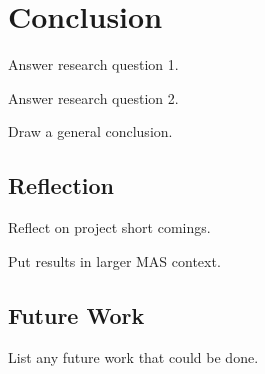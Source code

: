 \section{Conclusion}

Answer research question 1.

Answer research question 2.

Draw a general conclusion.

\subsection{Reflection}

Reflect on project short comings.

Put results in larger MAS context.

\subsection{Future Work}

List any future work that could be done.
